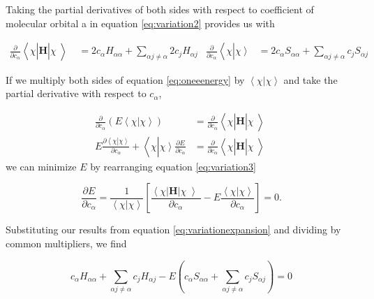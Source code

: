 Taking the partial derivatives of both sides with respect to coefficient of molecular orbital a in
equation \ref{eq:variation2} provides us with

\begin{align}
  \label{eq:variationexpansion}
  \frac{\partial}{\partial c_{\alpha}}
  \left<\right.\chi\left|\right.\bm{H}\left.\right|\chi\left>\right.&=
  2c_\alpha H_{\alpha \alpha} + \sum_{\alpha j \neq \alpha} 2c_j H_{\alpha j} &
  \frac{\partial}{\partial c_{\alpha}}
  \left<\right.\chi\left.\right|\left.\chi\left.\right.\right>&=
  2 c_\alpha S_{\alpha\alpha} + \sum_{\alpha j \neq \alpha} c_j S_{\alpha j}
\end{align}

If we multiply both sides of equation \ref{eq:oneeenergy} by
$\left<\right.\chi\left.\right|\left.\chi\left.\right.\right>$ and
take the partial derivative with respect to $c_{\alpha}$,

\begin{align}
  \frac{\partial}{\partial c_{\alpha}}
  \left( E \left<\right.\chi\left.\right|\left.\chi\left.\right.\right> \right)&=
  \frac{\partial}{\partial c_{\alpha}}
  \left<\right.\chi\left|\right.\bm{H}\left.\right|\chi\left>\right. \\
  \label{eq:variation3}
  E \frac{\partial \left<\right.\chi\left.\right|\left.\chi\left.\right.\right>}{\partial c_{\alpha}}
  + \left<\right.\chi\left.\right|\left.\chi\left.\right.\right> \frac{\partial E}{\partial c_{\alpha}} &=
  \frac{\partial}{\partial c_{\alpha}}
  \left<\right.\chi\left|\right.\bm{H}\left.\right|\chi\left>\right.
\end{align}
we can minimize $E$ by rearranging equation \ref{eq:variation3}

\begin{equation}
  \frac{\partial E}{\partial c_{\alpha}} =
  \frac{1}{\left<\right.\chi\left.\right|\left.\chi\left.\right.\right>}
  \left[
    \frac{\left<\right.\chi\left|\right.\bm{H}\left.\right|\chi\left>\right.}
         {\partial c_{\alpha}}
         -E \frac{\left<\right.\chi\left.\right|\left.\chi\left.\right.\right>}
         {\partial c_{\alpha}}
         \right] = 0.
\end{equation}

Substituting our results from equation \ref{eq:variationexpansion} and
dividing by common multipliers, we find

\begin{equation}
  c_{\alpha} H_{\alpha \alpha} + \sum_{\alpha j \neq \alpha} c_j H_{\alpha j} -
  E \left( c_{\alpha} S_{\alpha \alpha} + \sum_{\alpha j \neq \alpha} c_j S_{\alpha j} \right) = 0
\end{equation}

